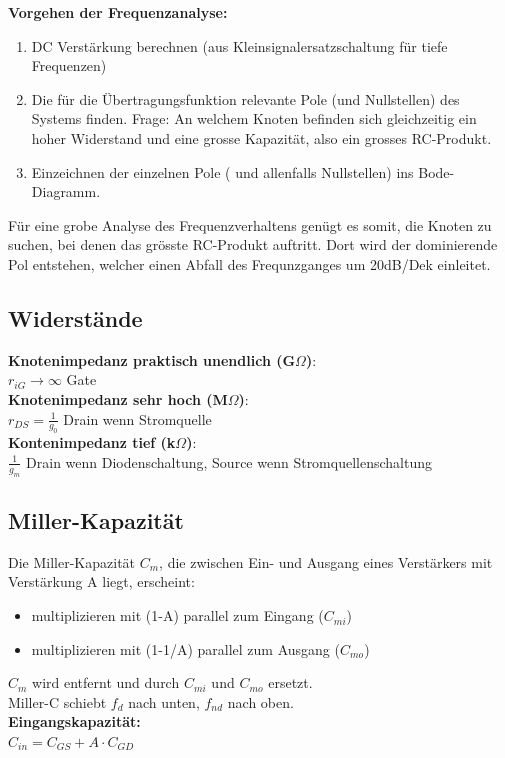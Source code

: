 \begin{minipage}{0.5\linewidth}
\textbf{Vorgehen der Frequenzanalyse:}
\begin{enumerate}[noitemsep,topsep=0pt]
    \item DC Verstärkung berechnen (aus Kleinsignalersatzschaltung für tiefe Frequenzen)
    \item Die für die Übertragungsfunktion relevante Pole (und Nullstellen) des Systems finden. Frage: An welchem Knoten befinden sich gleichzeitig ein hoher Widerstand und eine grosse Kapazität, also ein grosses RC-Produkt.
    \item Einzeichnen der einzelnen Pole ( und allenfalls Nullstellen) ins Bode-Diagramm.
\end{enumerate}
Für eine grobe Analyse des Frequenzverhaltens genügt es somit, die Knoten zu suchen, bei denen das grösste RC-Produkt auftritt. Dort wird der dominierende Pol entstehen, welcher einen Abfall des Frequnzganges um 20dB/Dek einleitet.
\subsection{Widerstände}
\textbf{Knotenimpedanz praktisch unendlich (G$\Omega$)}:\\ $r_{iG}\rightarrow \infty$ Gate\\
\textbf{Knotenimpedanz sehr hoch (M$\Omega$)}:\\ $r_{DS} = \frac{1}{g_0}$ Drain wenn Stromquelle\\
\textbf{Kontenimpedanz tief (k$\Omega$)}:\\ $\frac{1}{g_m}$ Drain wenn Diodenschaltung, Source wenn Stromquellenschaltung
\end{minipage}
\begin{minipage}{0.5\linewidth}
\subsection{Miller-Kapazität}
Die Miller-Kapazität $C_m$, die zwischen Ein- und Ausgang eines Verstärkers mit Verstärkung A liegt, erscheint:
\begin{itemize}[noitemsep,topsep=0pt]
    \item multiplizieren mit (1-A) parallel zum Eingang ($C_{mi}$)
    \item multiplizieren mit (1-1/A) parallel zum Ausgang ($C_{mo}$)
\end{itemize}
$C_m$ wird entfernt und durch $C_{mi}$ und $C_{mo}$ ersetzt.\\
Miller-C schiebt $f_d$ nach unten, $f_{nd}$ nach oben.\vspace{5pt}\\
\textbf{Eingangskapazität:}\\
$C_{in} = C_{GS}+A\cdot C_{GD}$
\end{minipage}\hspace{5pt}%
